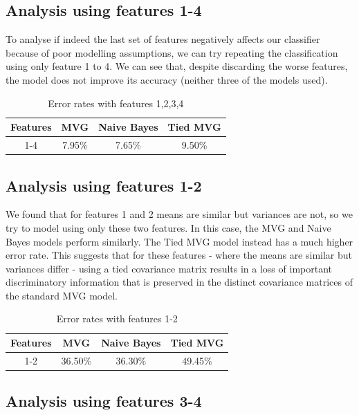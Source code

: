 \documentclass[12pt, a4paper]{article}
\begin{document}
\subsection{Analysis using features 1-4}

To analyse if indeed the last set of features negatively affects our classifier because of poor modelling assumptions, we can try repeating the classification using only feature 1 to 4. We can see that, despite discarding the worse features, the model does not improve its accuracy (neither three of the models used).

\begin{table}[ht!]
	\centering
 	\begin{tabular}{| | c c c c | |} 
 		\hline
 		Features & MVG & Naive Bayes & Tied MVG\\
 		\hline\hline
 		1-4 & 7.95\% & 7.65\% & 9.50\%\\
 		\hline
 	\end{tabular}
	\caption{Error rates with features 1,2,3,4}
\end{table}

\subsection{Analysis using features 1-2}

We found that for features 1 and 2 means are similar but variances are not, so we try to model using only these two features. In this case, the MVG and Naive Bayes models perform similarly. The Tied MVG model instead has a much higher error rate. This suggests that for these features - where the means are similar but variances differ - using a tied covariance matrix results in a loss of important discriminatory information that is preserved in the distinct covariance matrices of the standard MVG model.

\begin{table}[ht!]
	\centering
 	\begin{tabular}{| | c c c c | |} 
 		\hline
 		Features & MVG & Naive Bayes & Tied MVG\\
 		\hline\hline
 		1-2 & 36.50\% & 36.30\% & 49.45\%\\
 		\hline
 	\end{tabular}
	\caption{Error rates with features 1-2}
\end{table}

\subsection{Analysis using features 3-4}
\end{document}
